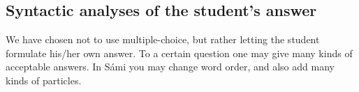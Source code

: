 \documentclass[11pt]{article}
\begin{document}
%




\subsection{Syntactic analyses of the student's answer} \label{sentencefeedback}
We have chosen not to use multiple-choice, but rather letting the student formulate his/her own answer. To a certain question one may give many kinds of acceptable answers. In Sámi you may change word order, and also add many kinds of particles. 
\end{document}
